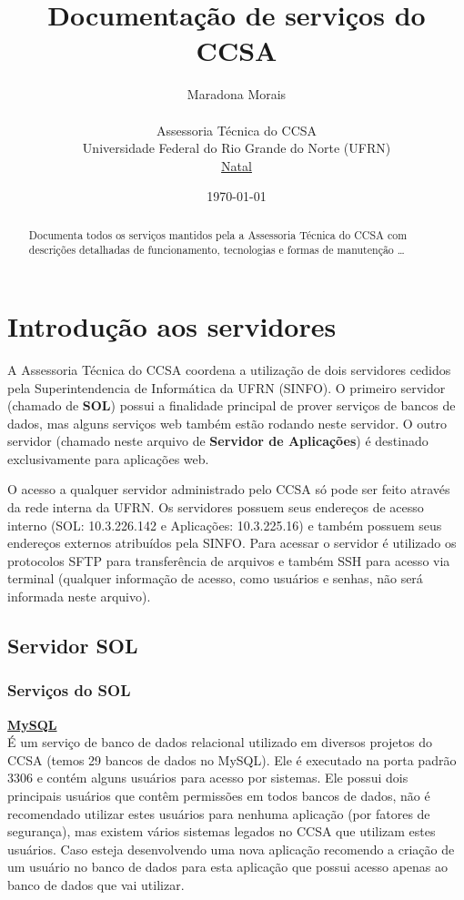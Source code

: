 \documentclass[12pt]{article}
\title{Documentação de serviços do CCSA}
\author{
        Maradona Morais\\\\
                Assessoria Técnica do CCSA\\
        Universidade Federal do Rio Grande do Norte (UFRN)\\
        \underline{Natal}
}
\date{\today}
\begin{document}
\maketitle

\begin{abstract}
Documenta todos os serviços mantidos pela a Assessoria Técnica do CCSA com descrições detalhadas de funcionamento, tecnologias e formas de manutenção \ldots
\end{abstract}
\newpage
\section{Introdução aos servidores}
A Assessoria Técnica do CCSA coordena a utilização de dois servidores cedidos pela Superintendencia de Informática da UFRN (SINFO). O primeiro servidor (chamado de \textbf{SOL}) possui a finalidade principal de prover serviços de bancos de dados, mas alguns serviços web também estão rodando neste servidor. O outro servidor (chamado neste arquivo de \textbf{Servidor de Aplicações}) é destinado exclusivamente para aplicações web.

O acesso a qualquer servidor administrado pelo CCSA só pode ser feito através da rede interna da UFRN. Os servidores possuem seus endereços de acesso interno (SOL: 10.3.226.142 e Aplicações: 10.3.225.16) e também possuem seus endereços externos atribuídos pela SINFO. Para acessar o servidor é utilizado os protocolos SFTP para transferência de arquivos e também SSH para acesso via terminal (qualquer informação de acesso, como usuários e senhas, não será informada neste arquivo). 

\subsection{Servidor SOL}
\subsubsection{Serviços do SOL}
\textbf{\href{https://www.mysql.com/}{MySQL}}\\
É um serviço de banco de dados relacional utilizado em diversos projetos do CCSA (temos 29 bancos de dados no MySQL). Ele é executado na porta padrão 3306 e contém alguns usuários para acesso por sistemas. Ele possui dois principais usuários que contêm permissões em todos bancos de dados, não é recomendado utilizar estes usuários para nenhuma aplicação (por fatores de segurança), mas existem vários sistemas legados no CCSA que utilizam estes usuários. Caso esteja desenvolvendo uma nova aplicação recomendo a criação de um usuário no banco de dados para esta aplicação que possui acesso apenas ao banco de dados que vai utilizar.\\
\end{document}
